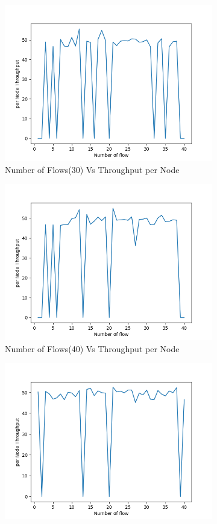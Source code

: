 \begin{figure}[h]
\begin{subfigure}{.5\textwidth}
    \includegraphics[width=.8\linewidth]{_11_2_mobile/NumberofFlow(30)vsperNodeThroughput.png}
         \caption{Number of Flows(30) Vs Throughput per Node}
        \end{subfigure}
\begin{subfigure}{.5\textwidth}
    \centering
    \includegraphics[width=.8\linewidth]{_11_2_mobile/NumberofFlow(40)vsperNodeThroughput.png}
         \caption{Number of Flows(40) Vs Throughput per Node}
        \end{subfigure}
\begin{subfigure}{.5\textwidth}
    \centering
    \includegraphics[width=.8\linewidth]{_11_2_mobile/NumberofFlow(50)vsperNodeThroughput.png}

\end{subfigure}
\end{figure}
